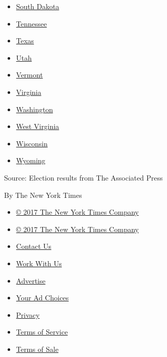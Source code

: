 \begin{itemize}
{  Carolina}
\item
  \href{//www.nytimes3xbfgragh.onion/elections/2016/results/south-dakota}{South
  Dakota}
\item
  \href{//www.nytimes3xbfgragh.onion/elections/2016/results/tennessee}{Tennessee}
\item
  \href{//www.nytimes3xbfgragh.onion/elections/2016/results/texas}{Texas}
\item
  \href{//www.nytimes3xbfgragh.onion/elections/2016/results/utah}{Utah}
\item
  \href{//www.nytimes3xbfgragh.onion/elections/2016/results/vermont}{Vermont}
\item
  \href{//www.nytimes3xbfgragh.onion/elections/2016/results/virginia}{Virginia}
\item
  \href{//www.nytimes3xbfgragh.onion/elections/2016/results/washington}{Washington}
\item
  \href{//www.nytimes3xbfgragh.onion/elections/2016/results/west-virginia}{West
  Virginia}
\item
  \href{//www.nytimes3xbfgragh.onion/elections/2016/results/wisconsin}{Wisconsin}
\item
  \href{//www.nytimes3xbfgragh.onion/elections/2016/results/wyoming}{Wyoming}
\end{itemize}

Source: Election results from The Associated Press

By The New York Times

\begin{itemize}
\tightlist
\item
  \href{//www.nytco.com}{© 2017 The New York Times Company}
\end{itemize}

\begin{itemize}
\tightlist
\item
  \href{//www.nytco.com}{© 2017 The New York Times Company}
\item
  \href{//www.nytimes3xbfgragh.onion/ref/membercenter/help/infoservdirectory.html}{Contact
  Us}
\item
  \href{//www.nytco.com/careers}{Work With Us}
\item
  \href{//www.nytimes.whsites.net/mediakit}{Advertise}
\item
  \href{//www.nytimes3xbfgragh.onion/content/help/rights/privacy/policy/privacy-policy.html\#pp}{Your
  Ad Choices}
\item
  \href{//www.nytimes3xbfgragh.onion/privacy}{Privacy}
\item
  \href{//www.nytimes3xbfgragh.onion/ref/membercenter/help/agree.html}{Terms
  of Service}
\item
  \href{//www.nytimes3xbfgragh.onion/content/help/rights/sale/terms-of-sale.html}{Terms
  of Sale}
\end{itemize}

